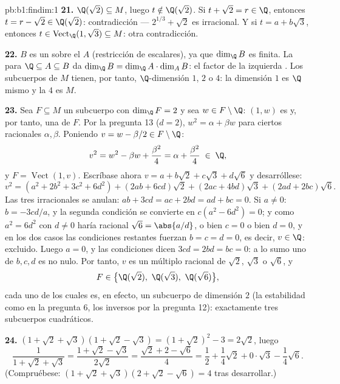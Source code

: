 \begin{solution}{pb:b1:findim:1}
\textbf{21.} $\Q(\sqrt2) \subseteq M$, luego $t \notin \Q(\sqrt2)$.
Si $t + \sqrt2 = r \in \Q$, entonces $t = r - \sqrt2 \in \Q(\sqrt2)$:
contradicción --- $2^{1/3} + \sqrt2$ es irracional. Y si
$t = a + b\sqrt3$, entonces
$t \in \operatorname{Vect}_\Q(1, \sqrt3) \subseteq M$: otra
contradicción.

\textbf{22.} $B$ es un  sobre el  $A$
(restricción de escalares),  ya que $\dim_\Q B$
es finita. La  para $\Q \subseteq A \subseteq B$ da
$\dim_\Q B = \dim_\Q A \cdot \dim_A B$: el factor de la izquierda
. Los subcuerpos de $M$ tienen, por tanto, $\Q$-dimensión
$1$, $2$ o $4$: la dimensión $1$ es $\Q$ mismo y la $4$ es $M$.

\textbf{23.} Sea $F \subseteq M$ un subcuerpo con $\dim_\Q F = 2$ y
sea $w \in F \setminus \Q$: $(1, w)$ es  y, por tanto, una
 de $F$. Por la pregunta 13 ($d = 2$), $w^2 = \alpha + \beta w$
para ciertos racionales $\alpha, \beta$. Poniendo
$v = w - \beta/2 \in F \setminus \Q$:
\[
v^2 = w^2 - \beta w + \frac{\beta^2}4 = \alpha + \frac{\beta^2}4
\;\in\; \Q,
\]
y $F = \operatorname{Vect}(1, v)$. Escríbase ahora
$v = a + b\sqrt2 + c\sqrt3 + d\sqrt6$ y desarróllese:
\[
v^2 = (a^2 + 2b^2 + 3c^2 + 6d^2)
+ (2ab + 6cd)\sqrt2 + (2ac + 4bd)\sqrt3 + (2ad + 2bc)\sqrt6 .
\]
Las tres  irracionales se anulan:
$ab + 3cd = ac + 2bd = ad + bc = 0$. Si $a \neq 0$: $b = -3cd/a$, y
la segunda condición se convierte en $c(a^2 - 6d^2) = 0$; y como
$a^2 = 6d^2$ con $d \neq 0$ haría racional $\sqrt6 = \abs{a/d}$, o
bien $c = 0$ o bien $d = 0$, y en los dos casos las condiciones
restantes fuerzan $b = c = d = 0$, es decir, $v \in \Q$: excluido.
Luego $a = 0$, y las condiciones dicen $3cd = 2bd = bc = 0$: a lo
sumo uno de $b, c, d$ es no nulo. Por tanto, $v$ es un múltiplo
racional de $\sqrt2$, $\sqrt3$ o $\sqrt6$, y
\[
F \in \bigl\{\Q(\sqrt2),\ \Q(\sqrt3),\ \Q(\sqrt6)\bigr\} ,
\]
cada uno de los cuales es, en efecto, un subcuerpo de dimensión $2$
(la estabilidad como en la pregunta 6, los inversos por la
pregunta 12): exactamente tres subcuerpos cuadráticos.

\textbf{24.} $(1 + \sqrt2 + \sqrt3)(1 + \sqrt2 - \sqrt3) =
(1 + \sqrt2)^2 - 3 = 2\sqrt2$, luego
\[
\frac1{1 + \sqrt2 + \sqrt3}
= \frac{1 + \sqrt2 - \sqrt3}{2\sqrt2}
= \frac{\sqrt2 + 2 - \sqrt6}{4}
= \frac12 + \frac14\sqrt2 + 0\cdot\sqrt3 - \frac14\sqrt6 .
\]
(Compruébese: $(1 + \sqrt2 + \sqrt3)(2 + \sqrt2 - \sqrt6) = 4$ tras
desarrollar.)


\end{solution}

